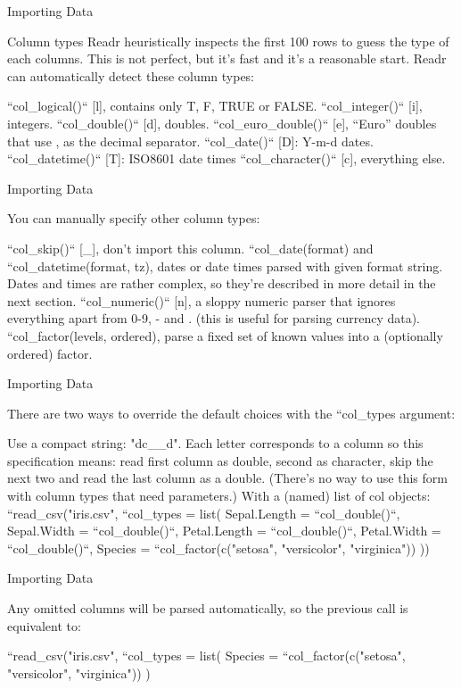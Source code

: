 
{Importing Data}


Column types
Readr heuristically inspects the first 100 rows to guess the type of each columns. This is not perfect, but it’s fast and it’s a reasonable start. Readr can automatically detect these column types:

``col_logical()`` [l], contains only T, F, TRUE or FALSE.
``col_integer()`` [i], integers.
``col_double()`` [d], doubles.
``col_euro_double()`` [e], “Euro” doubles that use , as the decimal separator.
``col_date()`` [D]: Y-m-d dates.
``col_datetime()`` [T]: ISO8601 date times
``col_character()`` [c], everything else.



{Importing Data}


You can manually specify other column types:

``col_skip()`` [_], don’t import this column.
``col_date(format) and ``col_datetime(format, tz), dates or date times parsed with given format string. Dates and times are rather complex, so they’re described in more detail in the next section.
``col_numeric()`` [n], a sloppy numeric parser that ignores everything apart from 0-9, - and . (this is useful for parsing currency data).
``col_factor(levels, ordered), parse a fixed set of known values into a (optionally ordered) factor.



{Importing Data}


There are two ways to override the default choices with the ``col_types argument:

Use a compact string: "dc__d". Each letter corresponds to a column so this specification means: read first column as double, second as character, skip the next two and read the last column as a double. (There’s no way to use this form with column types that need parameters.)
With a (named) list of col objects:
``read_csv("iris.csv", ``col_types = list(
  Sepal.Length = ``col_double()``,
  Sepal.Width = ``col_double()``,
  Petal.Length = ``col_double()``,
  Petal.Width = ``col_double()``,
  Species = ``col_factor(c("setosa", "versicolor", "virginica"))
))



{Importing Data}



Any omitted columns will be parsed automatically, so the previous call is equivalent to:

``read_csv("iris.csv", ``col_types = list(
  Species = ``col_factor(c("setosa", "versicolor", "virginica"))
)


